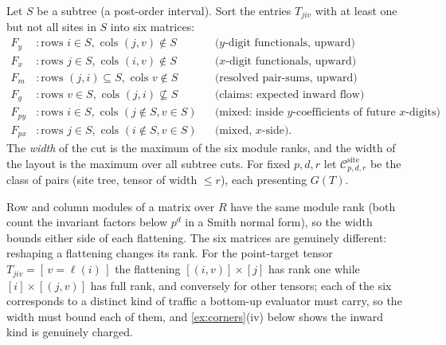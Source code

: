 \documentclass[a4paper,UKenglish,autoref,anonymous]{lipics-v2021}
\newcommand{\R}{R}                                   %
\newcommand{\site}[1]{\mathcal{C}^{\mathrm{site}}_{#1}}
\begin{document}
\begin{definition}
\label{def:flattenings}
Let $S$ be a subtree (a post-order interval). Sort the entries $T_{jiv}$
with at least one but not all sites in $S$ into six matrices:
\begin{align*}
F_y &: \text{rows } i \in S, \text{ cols } (j, v) \notin S
  &&\text{($y$-digit functionals, upward)}\\
F_x &: \text{rows } j \in S, \text{ cols } (i, v) \notin S
  &&\text{($x$-digit functionals, upward)}\\
F_m &: \text{rows } (j, i) \subseteq S, \text{ cols } v \notin S
  &&\text{(resolved pair-sums, upward)}\\
F_g &: \text{rows } v \in S, \text{ cols } (j, i) \not\subseteq S
  &&\text{(claims: expected inward flow)}\\
F_{py} &: \text{rows } i \in S, \text{ cols } (j \notin S, v \in S)
  &&\text{(mixed: inside $y$-coefficients of future $x$-digits)}\\
F_{px} &: \text{rows } j \in S, \text{ cols } (i \notin S, v \in S)
  &&\text{(mixed, $x$-side).}
\end{align*}
The \emph{width} of the cut is the maximum of the six module ranks, and
the width of the layout is the maximum over all subtree cuts. For fixed
$p, d, r$ let $\site{p,d,r}$ be the class of pairs (site tree, tensor of
width $\le r$), each presenting $G(T)$.
\end{definition}

Row and column modules of a matrix over $\R$ have the same module rank
(both count the invariant factors below $p^d$ in a Smith normal form),
so the width bounds either side of each flattening. The six matrices
are genuinely different: reshaping a flattening changes its rank. For
the point-target tensor $T_{jiv} = [\, v = \ell(i)\,]$ the flattening
$[(i,v)] \times [j]$ has rank one while $[i] \times [(j,v)]$ has full
rank, and conversely for other tensors; each of the six corresponds to a
distinct kind of traffic a bottom-up evaluator must carry, so the width
must bound each of them, and \autoref{ex:corners}(iv) below shows the
inward kind is genuinely charged.
\end{document}
